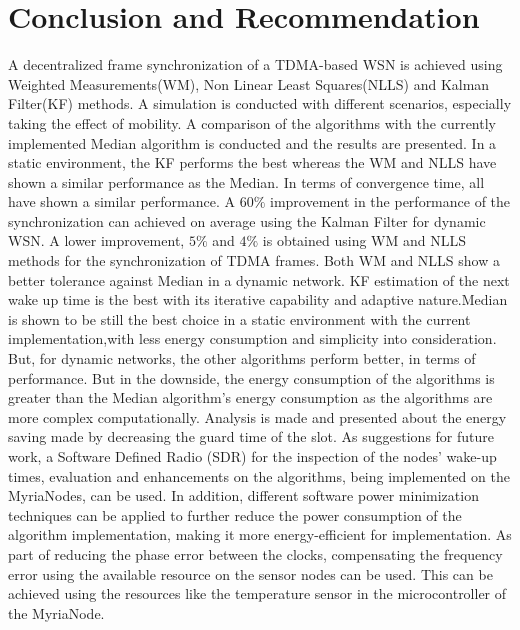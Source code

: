 \documentclass[journal]{IEEEtran}
\begin{document}
\section{\textbf{Conclusion and Recommendation}}
A decentralized frame synchronization of a TDMA-based WSN is achieved
using Weighted Measurements(WM), Non Linear Least Squares(NLLS) and
Kalman Filter(KF) methods. A simulation is conducted with different scenarios, especially
taking the effect of mobility. A comparison of the algorithms with the currently implemented Median algorithm
is conducted and the results are presented.
\newline
In a static environment, the KF performs the best whereas the WM and NLLS have shown a similar performance as the
Median. In terms of convergence time, all have shown a similar performance.
\newline
A $60\%$ improvement in the performance of the synchronization can
achieved on average using the Kalman Filter for dynamic WSN. A lower
improvement, $5\%$ and $4\%$ is obtained using WM and NLLS methods
for the synchronization of TDMA frames. Both WM and NLLS show a better tolerance
against Median in a dynamic network. KF estimation of
the next wake up time is the best with its iterative capability and
adaptive nature.\newline Median is shown to be still the best choice in a static environment with the current implementation,with less energy consumption and simplicity into consideration. But, for dynamic networks, the other algorithms perform better, in terms of
performance. 
\newline But in the downside, the energy consumption of the algorithms is
greater than the Median algorithm's energy consumption as the algorithms are more complex computationally. Analysis is made and presented about the energy saving made by decreasing the guard time of the slot. 
\newline  As suggestions for future work, a Software Defined Radio (SDR) for the inspection of the nodes' wake-up times, evaluation and enhancements on the algorithms, being implemented on the MyriaNodes, can be used. In addition, different software power minimization techniques can be applied to further reduce the power consumption of the algorithm implementation, making it more energy-efficient for implementation.  As part of reducing the phase error between the clocks, compensating the frequency error using the available resource on the sensor nodes can be used. This can be achieved using the resources like the temperature sensor in the
microcontroller of the MyriaNode.
\end{document}
